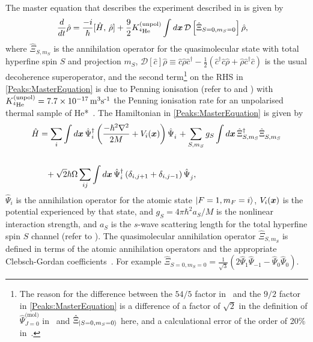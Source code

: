The master equation that describes the experiment described in  is given by
\begin{align}
    \label{Peaks:MasterEquation}
    \frac{d }{d t}\hat{\rho} &= \frac{-i}{\hbar} [\hat{H},\, \hat{\rho} ] + \frac{9}{2} K^\text{(unpol)}_{^{4}\text{He}} \int d \vect{x}\, \mathcal{D}\left[\hat{\Xi}_{S=0,m_S=0} \right] \hat{\rho},
\end{align}
where $\displaystyle\hat{\Xi}_{S, m_S}$ is the annihilation operator for the quasimolecular state with total hyperfine spin $S$ and projection $m_S$, $\mathcal{D}[\hat{c}]\hat{\rho} \equiv \hat{c}\hat{\rho}\hat{c}^\dagger - \frac{1}{2}(\hat{c}^\dagger \hat{c} \hat{\rho} + \hat{\rho} \hat{c}^\dagger \hat{c})$ is the usual decoherence superoperator, and the second term\footnote{The reason for the difference between the ${54}/{5}$ factor in~\citet{Dall:2009} and the $9/2$ factor in \eqref{Peaks:MasterEquation} is a difference of a factor of $\sqrt{2}$ in the definition of $\hat{\Psi}_{J=0}^{\text{(mol)}}$ in~\citep{Dall:2009} and $\displaystyle\hat{\Xi}_{\left|S=0, m_S=0\right>}$ here, and a calculational error of the order of 20\% in~\citep{Dall:2009}.} on the RHS in \eqref{Peaks:MasterEquation} is due to Penning ionisation (refer to  and ) with $K^\text{(unpol)}_{^{4}\text{He}}=\unit[7.7\times 10^{-17}]{m\textsuperscript{3}s\textsuperscript{-1}}$ the Penning ionisation rate for an unpolarised thermal sample of He*~\citep{Stas:2006kx}. The Hamiltonian in \eqref{Peaks:MasterEquation} is given by
\begin{align}
    \label{Peaks:3DHamiltonian}
    \begin{split}
    \hat{H} &= \sum_i \int d\vect{x}\, \hat{\Psi}_i^\dagger \left(\frac{-\hbar^2 \nabla^2}{2 M} + V_i(\vect{x})\right)\hat{\Psi}_i^{\phantom{\dagger}} + \sum_{S, m_S} g_{S}\int d\vect{x}\, \hat{\Xi}_{S, m_S}^\dagger \hat{\Xi}_{S, m_S}^{\phantom{\dagger}}\\
    \\
            &\phantom{=} + \sqrt{2} \hbar \Omega \sum_{i j}\int d\vect{x}\, \hat{\Psi}_i^\dagger \left(\delta_{i, j+1} + \delta_{i, j-1}\right) \hat{\Psi}_j^{\phantom{\dagger}},
    \end{split}
\end{align}
$\displaystyle \hat{\Psi}_i$ is the annihilation operator for the atomic state $\displaystyle {\ensuremath{\left|F=1, m_F=i\right>}}$, $V_i(\bm{x})$ is the potential experienced by that state, and $g_S = 4 \pi \hbar^2 a_S/M$ is the nonlinear interaction strength, and $a_S$ is the $s$-wave scattering length for the total hyperfine spin $S$ channel (refer to ). The quasimolecular annihilation operator $\displaystyle \hat{\Xi}_{S, m_S}$ is defined in terms of the atomic annihilation operators and the appropriate Clebsch-Gordan coefficients~\citep{Ho:1998}. For example $\displaystyle \hat{\Xi}_{S=0, m_S=0} = \frac{1}{\sqrt{3}} \left( 2 \hat{\Psi}_1 \hat{\Psi}_{-1} - \hat{\Psi}_0 \hat{\Psi}_0\right)$.

